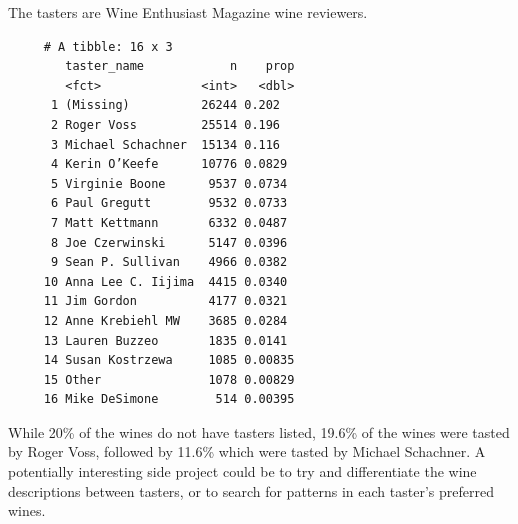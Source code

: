 \documentclass[12pt,twoside]{amherstthesis}
\newenvironment{Shaded}{\begin{snugshade}}{\end{snugshade}}
\newcommand{\KeywordTok}[1]{\textcolor[rgb]{0.13,0.29,0.53}{\textbf{#1}}}
\newcommand{\DataTypeTok}[1]{\textcolor[rgb]{0.13,0.29,0.53}{#1}}
\newcommand{\DecValTok}[1]{\textcolor[rgb]{0.00,0.00,0.81}{#1}}
\newcommand{\StringTok}[1]{\textcolor[rgb]{0.31,0.60,0.02}{#1}}
\newcommand{\OtherTok}[1]{\textcolor[rgb]{0.56,0.35,0.01}{#1}}
\newcommand{\OperatorTok}[1]{\textcolor[rgb]{0.81,0.36,0.00}{\textbf{#1}}}
\newcommand{\NormalTok}[1]{#1}
\begin{document}
The tasters are Wine Enthusiast Magazine wine reviewers.
\begin{Shaded}
\end{Shaded}
\begin{verbatim}
     # A tibble: 16 x 3
        taster_name            n    prop
        <fct>              <int>   <dbl>
      1 (Missing)          26244 0.202  
      2 Roger Voss         25514 0.196  
      3 Michael Schachner  15134 0.116  
      4 Kerin O’Keefe      10776 0.0829 
      5 Virginie Boone      9537 0.0734 
      6 Paul Gregutt        9532 0.0733 
      7 Matt Kettmann       6332 0.0487 
      8 Joe Czerwinski      5147 0.0396 
      9 Sean P. Sullivan    4966 0.0382 
     10 Anna Lee C. Iijima  4415 0.0340 
     11 Jim Gordon          4177 0.0321 
     12 Anne Krebiehl MW    3685 0.0284 
     13 Lauren Buzzeo       1835 0.0141 
     14 Susan Kostrzewa     1085 0.00835
     15 Other               1078 0.00829
     16 Mike DeSimone        514 0.00395
\end{verbatim}
While 20\% of the wines do not have tasters listed, 19.6\% of the wines
were tasted by Roger Voss, followed by 11.6\% which were tasted by
Michael Schachner. A potentially interesting side project could be to
try and differentiate the wine descriptions between tasters, or to
search for patterns in each taster's preferred wines.
\end{document}
